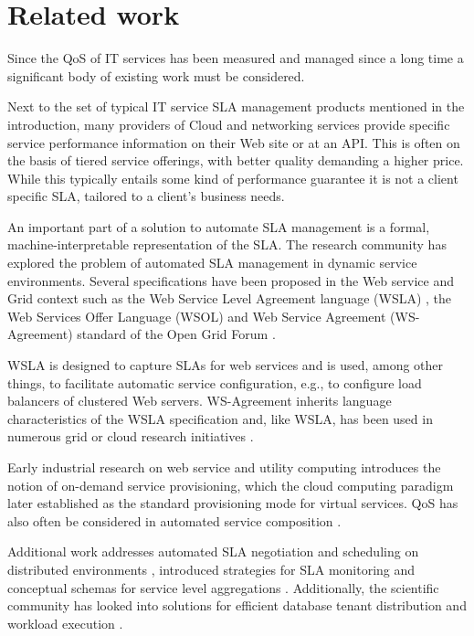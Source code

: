 \section{Related work}
Since the  QoS of IT services has been measured and managed since a long time a significant body of existing work must be considered. 

Next to the set of typical IT service SLA management products mentioned in the introduction, many providers of Cloud and networking services provide specific service performance information on their Web site or at an API. This is often on the basis of tiered service offerings, with better quality demanding a higher price. While this typically entails some kind of performance guarantee it is not a client specific SLA, tailored to a client's business needs.

An important part of a solution to automate SLA management is a formal, machine-interpretable representation of the SLA. The research community has explored the problem of automated SLA management in dynamic service environments. Several specifications have been proposed in the Web service and Grid context such as the Web Service Level Agreement language (WSLA) \cite{wsla}, the Web Services Offer Language (WSOL) \cite{wsol} and Web Service Agreement (WS-Agreement) standard of the Open Grid Forum \cite{wsag}. 

WSLA is designed to capture SLAs for web services and is used, among other things, to facilitate automatic service configuration, e.g., to configure load balancers of clustered Web servers. WS-Agreement inherits language characteristics of the WSLA specification and, like WSLA, has been used in numerous grid or cloud research initiatives \cite{soi, butler, cslam, kouki}. 

Early industrial research on web service and utility computing \cite{ludwig, IBM1, dan} introduces the notion of on-demand service provisioning, which the cloud computing paradigm later established as the standard provisioning mode for virtual services. QoS has also often be considered in automated service composition \cite{boualem}.

Additional work addresses automated SLA negotiation and scheduling on distributed environments \cite{SNAP, lessons}, introduced strategies for SLA monitoring \cite{rana} and conceptual schemas for service level aggregations \cite{ulhaq}. Additionally, the scientific community has looked into solutions for efficient database tenant distribution and workload execution \cite{kraska, nec, sakr}. 

